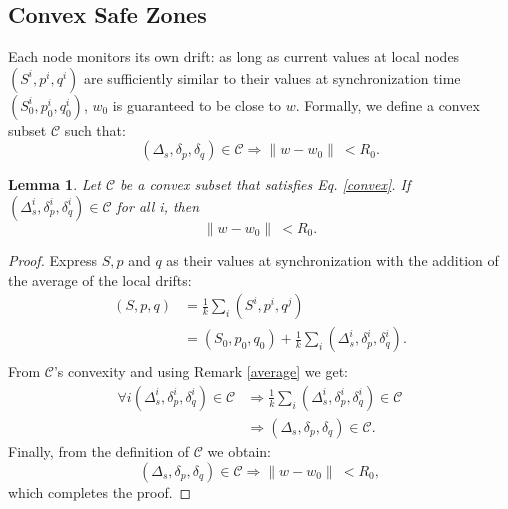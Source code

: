 \documentclass{sig-alternate-05-2015}
\newtheorem{lemma}{Lemma}
\begin{document}
\subsection{Convex Safe Zones}
Each node monitors its own drift: as long as current values
at local nodes $(S^i,p^i,q^i)$ are sufficiently similar to their values
at synchronization time $(S^i_0,p^i_0,q^i_0)$, $w_0$ is guaranteed to be close to $w$.
Formally, we define a convex subset $\mathcal{C}$ such that:
\begin{equation} \label{convex}
(\Delta_s, \delta_p, \delta_q) \in \mathcal{C} \Rightarrow \parallel w-w_0
\parallel \ < R_0.
\end{equation}
\begin{lemma}
Let $\mathcal{C}$ be a convex subset that satisfies Eq. \ref{convex}.
If $(\Delta_s^i, \delta_p^i, \delta_q^i) \in \mathcal{C}$ for all i, then
\begin{equation*}
\parallel w-w_0 \parallel \ < R_0.
\end{equation*}
\end{lemma}
\begin{proof}
Express $S, p$ and $q$ as their values at synchronization with the addition of the
average of the local drifts:
\begin{equation*} 
\begin{split}
(S,p,q) & = \frac{1}{k} \sum_i (S^i,p^i,q^j) \\
 & = (S_0,p_0,q_0) + \frac{1}{k} \sum_i (\Delta_s^i,\delta^i_p,\delta_q^i). \\
\end{split}
\end{equation*}
From $\mathcal{C}$'s convexity and using Remark \ref{average} we get:
\begin{equation*} 
\begin{split}
\forall i (\Delta_s^i,\delta^i_p,\delta_q^i) \in \mathcal{C} & \Rightarrow 
\frac{1}{k} \sum_i (\Delta_s^i,\delta^i_p,\delta_q^i) \in \mathcal{C} \\
& \Rightarrow (\Delta_s,\delta_p,\delta_q) \in \mathcal{C}.
\end{split}
\end{equation*}
Finally, from the definition of $\mathcal{C}$ we obtain:
\begin{equation*}
(\Delta_s,\delta_p,\delta_q) \in \mathcal{C} \Rightarrow \parallel w-w_0
\parallel \ < R_0,
\end{equation*}
which completes the proof.
\end{proof}
\end{document}
